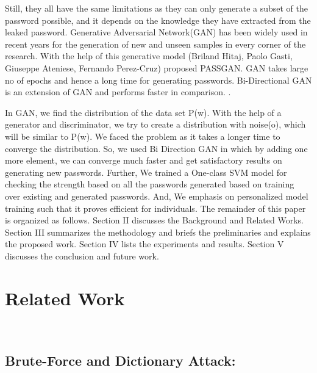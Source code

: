 \documentclass[runningheads]{llncs}
\begin{document}
Still, they all have the same limitations as they can only generate a subset of the password possible, and it depends on the knowledge they have extracted from the leaked password. Generative Adversarial Network(GAN) has been widely used in recent years for the generation of new and unseen samples in every corner of the research. \cite{goodfellow2014generative} With the help of this generative model (Briland Hitaj, Paolo Gasti, Giuseppe Ateniese, Fernando Perez-Cruz) proposed PASSGAN.\cite{DBLP:journals/corr/abs-1709-00440} GAN takes large no of epochs and hence a long time for generating passwords. Bi-Directional GAN is an extension of GAN and performs faster in comparison. \cite{DBLP:journals/corr/DonahueKD16}. 

In GAN, we find the distribution of the data set P(w). With the help of a generator and discriminator, we try to create a distribution with noise(o), which will be similar to P(w). We faced the problem as it takes a longer time to converge the distribution. So, we used Bi Direction GAN in which by adding one more element, we can converge much faster and get satisfactory results on generating new passwords. Further, We trained a One-class SVM model for checking the strength based on all the passwords generated based on training over existing and generated passwords. And, We emphasis on personalized model training such that it proves efficient for individuals. The remainder of this paper is organized as follows. Section II discusses the Background and Related Works. Section III summarizes the methodology and briefs the preliminaries and explains the proposed work. Section IV lists the experiments and results. Section V discusses the conclusion and future work.

\section{Related Work}
\\

\subsection{\textbf{Brute-Force and Dictionary Attack:}}
\newline 
\end{document}
